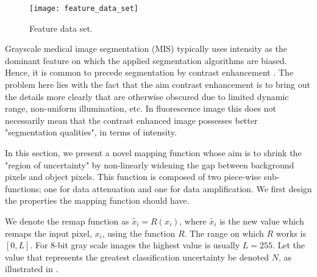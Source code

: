 \begin{figure}[!h]
	\centering
	\texttt{[image: feature\_data\_set]}
	\caption{Feature data set.}
	\label{fig:featuredataset}
\end{figure}

Grayscale medical image segmentation (MIS) typically uses intensity as the dominant feature on which the applied segmentation algorithms are biased. Hence, it is common to precede segmentation by contrast enhancement \citep{Kim2003,Subr2005}. The problem here lies with the fact that the aim contrast enhancement is to bring out the details more clearly that are otherwise obscured due to limited dynamic range, non-uniform illumination, etc. In fluorescence image this does not necessarily mean that the contrast enhanced image possesses better "segmentation qualities", in terms of intensity.

In this section, we present a novel mapping function whose aim is to shrink the "region of uncertainty" by non-linearly widening the gap between background pixels and object pixels. This function is composed of two piece-wise sub-functions; one for data attenuation and one for data amplification. We first design the properties the mapping function should have. 

\begin{definition}
	We denote the remap function as $\widetilde{x_i} = R(x_i)$, where $\widetilde{x_i}$ is the new value which remaps the input pixel, $x_i$, using the function $R$. The range on which $R$ works is $[0,L]$. For 8-bit gray scale images the highest value is usually $L=255$. Let the value that represents the greatest classification uncertainty be denoted $N$, as illustrated in .
\end{definition}

